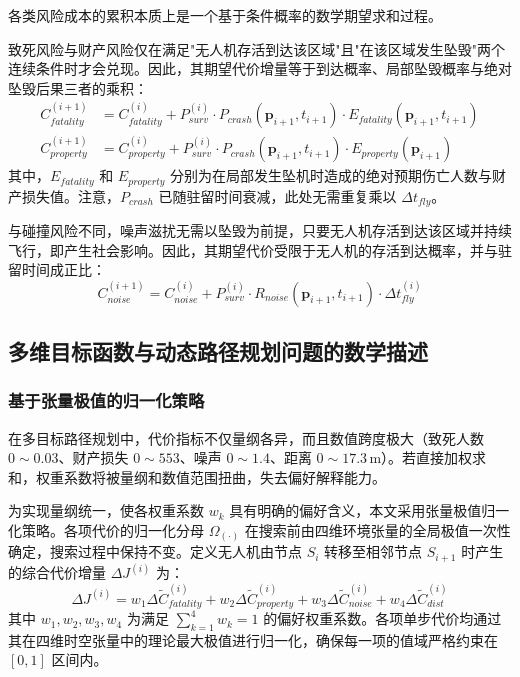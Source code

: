 各类风险成本的累积本质上是一个基于条件概率的数学期望求和过程。

致死风险与财产风险仅在满足"无人机存活到达该区域"且"在该区域发生坠毁"两个连续条件时才会兑现。因此，其期望代价增量等于到达概率、局部坠毁概率与绝对坠毁后果三者的乘积：
\begin{align}
C_{fatality}^{(i+1)} &= C_{fatality}^{(i)} + P_{surv}^{(i)} \cdot P_{crash}(\mathbf{p}_{i+1}, t_{i+1}) \cdot E_{fatality}(\mathbf{p}_{i+1}, t_{i+1}) \label{eq:fatality_evolution} \\
C_{property}^{(i+1)} &= C_{property}^{(i)} + P_{surv}^{(i)} \cdot P_{crash}(\mathbf{p}_{i+1}, t_{i+1}) \cdot E_{property}(\mathbf{p}_{i+1})
\end{align}
其中，$E_{fatality}$ 和 $E_{property}$ 分别为在局部发生坠机时造成的绝对预期伤亡人数与财产损失值。注意，$P_{crash}$ 已随驻留时间衰减，此处无需重复乘以 $\Delta t_{fly}$。

与碰撞风险不同，噪声滋扰无需以坠毁为前提，只要无人机存活到达该区域并持续飞行，即产生社会影响。因此，其期望代价受限于无人机的存活到达概率，并与驻留时间成正比：
\begin{equation}
C_{noise}^{(i+1)} = C_{noise}^{(i)} + P_{surv}^{(i)} \cdot R_{noise}(\mathbf{p}_{i+1}, t_{i+1}) \cdot \Delta t_{fly}^{(i)}
\label{eq:noise_evolution}
\end{equation}


\subsection{多维目标函数与动态路径规划问题的数学描述}

\subsubsection{基于张量极值的归一化策略}

在多目标路径规划中，代价指标不仅量纲各异，而且数值跨度极大（致死人数 $0\sim0.03$、财产损失 $0\sim553$、噪声 $0\sim1.4$、距离 $0\sim17.3\,\text{m}$）。若直接加权求和，权重系数将被量纲和数值范围扭曲，失去偏好解释能力。

为实现量纲统一，使各权重系数 $w_k$ 具有明确的偏好含义，本文采用张量极值归一化策略。各项代价的归一化分母 $\Omega_{(\cdot)}$ 在搜索前由四维环境张量的全局极值一次性确定，搜索过程中保持不变。定义无人机由节点 $S_i$ 转移至相邻节点 $S_{i+1}$ 时产生的综合代价增量 $\Delta J^{(i)}$ 为：
\begin{equation}
\Delta J^{(i)} = w_1 \Delta \tilde{C}_{fatality}^{(i)} + w_2 \Delta \tilde{C}_{property}^{(i)} + w_3 \Delta \tilde{C}_{noise}^{(i)} + w_4 \Delta \tilde{C}_{dist}^{(i)}
\end{equation}
其中 $w_1, w_2, w_3, w_4$ 为满足 $\sum_{k=1}^4 w_k = 1$ 的偏好权重系数。各项单步代价均通过其在四维时空张量中的理论最大极值进行归一化，确保每一项的值域严格约束在 $[0,1]$ 区间内。

